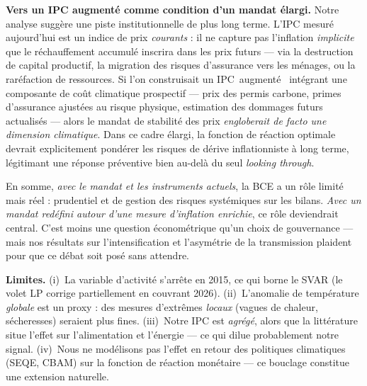 \documentclass[11pt,a4paper]{article}
\providecommand{\og}{\guillemotleft\,}
\providecommand{\fg}{\,\guillemotright}
\begin{document}
\textbf{Vers un IPC augmenté comme condition d'un mandat élargi.} Notre analyse suggère une
piste institutionnelle de plus long terme. L'IPC mesuré aujourd'hui est un indice de prix
\emph{courants} : il ne capture pas l'inflation \emph{implicite} que le réchauffement
accumulé inscrira dans les prix futurs --- via la destruction de capital productif, la
migration des risques d'assurance vers les ménages, ou la raréfaction de ressources. Si
l'on construisait un IPC \og augmenté \fg{} intégrant une composante de coût climatique
prospectif --- prix des permis carbone, primes d'assurance ajustées au risque physique,
estimation des dommages futurs actualisés --- alors le mandat de stabilité des prix
\emph{engloberait de facto une dimension climatique}. Dans ce cadre élargi, la fonction de
réaction optimale devrait explicitement pondérer les risques de dérive inflationniste à
long terme, légitimant une réponse préventive bien au-delà du seul \emph{looking through}.

En somme, \emph{avec le mandat et les instruments actuels}, la BCE a un rôle limité mais
réel : prudentiel et de gestion des risques systémiques sur les bilans. \emph{Avec un mandat
redéfini autour d'une mesure d'inflation enrichie}, ce rôle deviendrait central. C'est moins
une question économétrique qu'un choix de gouvernance --- mais nos résultats sur
l'intensification et l'asymétrie de la transmission plaident pour que ce débat soit posé
sans attendre.

\textbf{Limites.} (i)~La variable d'activité s'arrête en 2015, ce qui borne le SVAR (le volet
LP corrige partiellement en couvrant 2026). (ii)~L'anomalie de température \emph{globale} est
un proxy : des mesures d'extrêmes \emph{locaux} (vagues de chaleur, sécheresses) seraient
plus fines. (iii)~Notre IPC est \emph{agrégé}, alors que la littérature situe l'effet sur
l'alimentation et l'énergie --- ce qui dilue probablement notre signal. (iv)~Nous ne modélisons
pas l'effet en retour des politiques climatiques (SEQE, CBAM) sur la fonction de réaction
monétaire --- ce bouclage constitue une extension naturelle.
\end{document}

